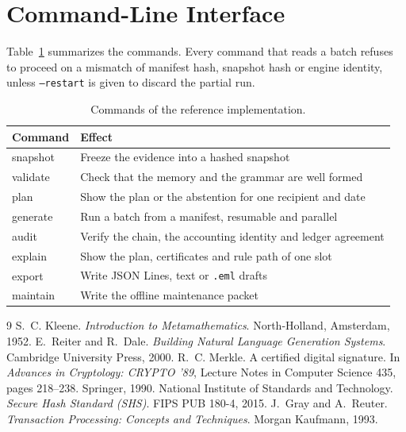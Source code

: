 \documentclass[11pt]{article}
\theoremstyle{definition}
\theoremstyle{remark}
\newcommand{\code}[1]{\texttt{#1}}
\begin{document}
\section{Command-Line Interface}

Table~\ref{tab:cli} summarizes the commands. Every command that reads a batch refuses to proceed on a mismatch of manifest hash, snapshot hash or engine identity, unless \code{--restart} is given to discard the partial run.

\begin{table}[H]
\centering
\caption{Commands of the reference implementation.}\label{tab:cli}
\begin{tabular}{lp{9.4cm}}
\toprule
Command & Effect\\
\midrule
snapshot & Freeze the evidence into a hashed snapshot\\
validate & Check that the memory and the grammar are well formed\\
plan & Show the plan or the abstention for one recipient and date\\
generate & Run a batch from a manifest, resumable and parallel\\
audit & Verify the chain, the accounting identity and ledger agreement\\
explain & Show the plan, certificates and rule path of one slot\\
export & Write JSON Lines, text or \code{.eml} drafts\\
maintain & Write the offline maintenance packet\\
\bottomrule
\end{tabular}
\end{table}

\clearpage
\begin{thebibliography}{9}
 S.~C. Kleene. \emph{Introduction to Metamathematics}. North-Holland, Amsterdam, 1952.
 E.~Reiter and R.~Dale. \emph{Building Natural Language Generation Systems}. Cambridge University Press, 2000.
 R.~C. Merkle. A certified digital signature. In \emph{Advances in Cryptology: CRYPTO '89}, Lecture Notes in Computer Science 435, pages 218--238. Springer, 1990.
 National Institute of Standards and Technology. \emph{Secure Hash Standard (SHS)}. FIPS PUB 180-4, 2015.
 J.~Gray and A.~Reuter. \emph{Transaction Processing: Concepts and Techniques}. Morgan Kaufmann, 1993.
\end{thebibliography}
\end{document}
